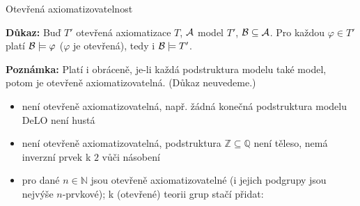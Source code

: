 \documentclass{beamer}
\begin{document}
\begin{frame}{Otevřená axiomatizovatelnost}

    \smallskip

    \pause
    
    \pause
    \textbf{Důkaz:}
    Buď $T'$ otevřená axiomatizace $T$, $\mathcal{A}$ model $T'$, $\mathcal{B}\subseteq\mathcal{A}$. Pro každou $\varphi\in T'$ platí $\mathcal{B}\models\varphi$ ($\varphi$ je otevřená), tedy i $\mathcal{B}\models T'$.  
    \hfill\qedsymbol

    \pause
    \textbf{Poznámka:} Platí i obráceně, je-li každá podstruktura modelu také model, potom je otevřeně axiomatizovatelná. (Důkaz neuvedeme.)

    \pause
    \begin{itemize}
        \item {} není otevřeně axiomatizovatelná, např. žádná konečná podstruktura modelu DeLO není hustá\pause
        \item {} není otevřeně axiomatizovatelná, podstruktura $\mathbb Z\subseteq\mathbb Q$ není těleso, nemá inverzní prvek k $2$ vůči násobení\pause
        \item pro dané $n\in\mathbb N$ jsou  otevřeně axiomatizovatelné (i jejich podgrupy jsou nejvýše $n$-prvkové); k (otevřené) teorii grup stačí přidat: 
    \end{itemize}

\end{frame}
\end{document}
